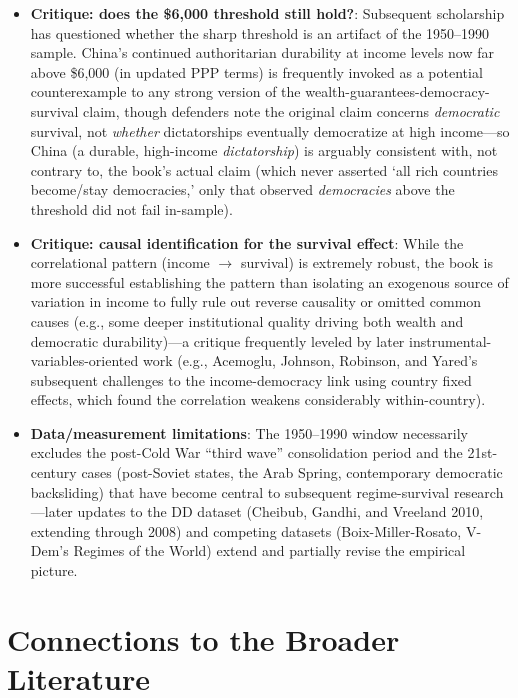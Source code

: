 \documentclass[12pt]{article}
\begin{document}
\begin{itemize}[leftmargin=*, itemsep=4pt]
    \item \textbf{Critique: does the \$6,000 threshold still hold?}: Subsequent scholarship has questioned whether the sharp threshold is an artifact of the 1950--1990 sample. China's continued authoritarian durability at income levels now far above \$6,000 (in updated PPP terms) is frequently invoked as a potential counterexample to any strong version of the wealth-guarantees-democracy-survival claim, though defenders note the original claim concerns \textit{democratic} survival, not \textit{whether} dictatorships eventually democratize at high income---so China (a durable, high-income \textit{dictatorship}) is arguably consistent with, not contrary to, the book's actual claim (which never asserted `all rich countries become/stay democracies,' only that observed \textit{democracies} above the threshold did not fail in-sample).
    \item \textbf{Critique: causal identification for the survival effect}: While the correlational pattern (income $\to$ survival) is extremely robust, the book is more successful establishing the pattern than isolating an exogenous source of variation in income to fully rule out reverse causality or omitted common causes (e.g., some deeper institutional quality driving both wealth and democratic durability)---a critique frequently leveled by later instrumental-variables-oriented work (e.g., Acemoglu, Johnson, Robinson, and Yared's subsequent challenges to the income-democracy link using country fixed effects, which found the correlation weakens considerably within-country).
    \item \textbf{Data/measurement limitations}: The 1950--1990 window necessarily excludes the post-Cold War ``third wave'' consolidation period and the 21st-century cases (post-Soviet states, the Arab Spring, contemporary democratic backsliding) that have become central to subsequent regime-survival research---later updates to the DD dataset (Cheibub, Gandhi, and Vreeland 2010, extending through 2008) and competing datasets (Boix-Miller-Rosato, V-Dem's Regimes of the World) extend and partially revise the empirical picture.
\end{itemize}

\section{Connections to the Broader Literature}
\end{document}

